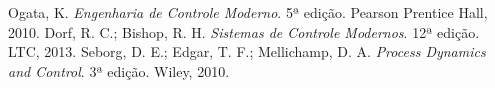 \documentclass[a4paper,12pt]{report}
\begin{document}
\begin{thebibliography}{9}
     Ogata, K. \textit{Engenharia de Controle Moderno}. 5ª edição. Pearson Prentice Hall, 2010.
     Dorf, R. C.; Bishop, R. H. \textit{Sistemas de Controle Modernos}. 12ª edição. LTC, 2013.
     Seborg, D. E.; Edgar, T. F.; Mellichamp, D. A. \textit{Process Dynamics and Control}. 3ª edição. Wiley, 2010.
\end{thebibliography}
\end{document}
